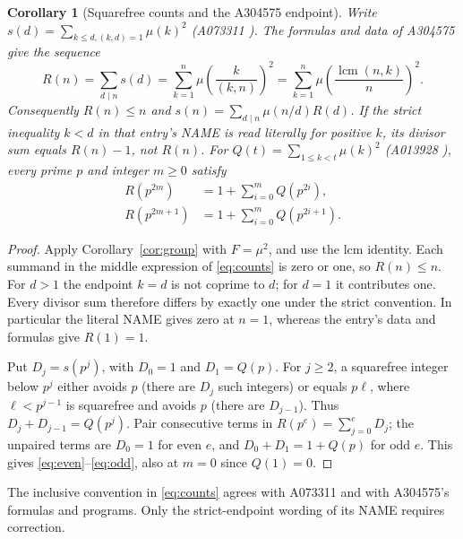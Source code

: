 \documentclass[11pt]{article}
\newtheorem{corollary}[theorem]{Corollary}
\newcommand{\mob}{\mu}
\begin{document}
\begin{corollary}[Squarefree counts and the A304575 endpoint]\label{cor:counts}
Write $s(d)=\sum_{k\leq d,(k,d)=1}\mob(k)^2$ (A073311 \cite{a073311}).
The formulas and data of A304575 \cite{a304575} give the sequence
\begin{equation}\label{eq:counts}
 R(n)=\sum_{d\mid n}s(d)
 =\sum_{k=1}^{n}\mob\!\left(\frac{k}{(k,n)}\right)^2
 =\sum_{k=1}^{n}\mob\!\left(\frac{\operatorname{lcm}(n,k)}{n}\right)^2.
\end{equation}
Consequently $R(n)\leq n$ and
$s(n)=\sum_{d\mid n}\mob(n/d)R(d)$.
If the strict inequality $k<d$ in that entry's NAME is read literally
for positive $k$, its divisor sum equals $R(n)-1$, not $R(n)$.
For $Q(t)=\sum_{1\leq k<t}\mob(k)^2$ (A013928 \cite{a013928}),
every prime $p$ and integer $m\geq0$ satisfy
\begin{align}
 R(p^{2m})&=1+\sum_{i=0}^{m}Q(p^{2i}),\label{eq:even}\\
 R(p^{2m+1})&=1+\sum_{i=0}^{m}Q(p^{2i+1}).\label{eq:odd}
\end{align}
\end{corollary}
\begin{proof}
Apply Corollary~\ref{cor:group} with $F=\mob^2$, and use the lcm
identity. Each summand in the middle expression of \eqref{eq:counts}
is zero or one, so $R(n)\leq n$.
For $d>1$ the endpoint $k=d$ is not coprime to $d$; for $d=1$ it
contributes one. Every divisor sum therefore differs by exactly one
under the strict convention. In particular the literal NAME gives zero
at $n=1$, whereas the entry's data and formulas give $R(1)=1$.

Put $D_j=s(p^j)$, with $D_0=1$ and $D_1=Q(p)$.
For $j\geq2$, a squarefree integer below $p^j$ either avoids $p$
(there are $D_j$ such integers) or equals $p\ell$, where $\ell<p^{j-1}$
is squarefree and avoids $p$ (there are $D_{j-1}$).
Thus $D_j+D_{j-1}=Q(p^j)$. Pair consecutive terms in
$R(p^e)=\sum_{j=0}^{e}D_j$; the unpaired terms are $D_0=1$
for even $e$, and $D_0+D_1=1+Q(p)$ for odd $e$.
This gives \eqref{eq:even}--\eqref{eq:odd}, also at $m=0$ since $Q(1)=0$.
\end{proof}
The inclusive convention in \eqref{eq:counts} agrees with A073311 and
with A304575's formulas and programs. Only the strict-endpoint wording
of its NAME requires correction.
\end{document}
